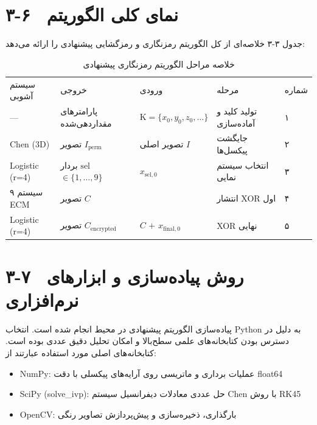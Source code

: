 \section{۳-۶  نمای کلی الگوریتم}

جدول ۳-۳ خلاصه‌ای از کل الگوریتم رمزنگاری و رمزگشایی پیشنهادی را ارائه می‌دهد:

\begin{table}[h]
\centering
\small
\begin{tabular}{lllll}
\hline
سیستم آشوبی & خروجی & ورودی & مرحله & شماره \\
‎---‎ & پارامترهای مقداردهی‌شده & $\mathrm{K} = \{x_0, y_0, z_0, \ldots\}$ & تولید کلید و آماده‌سازی & ۱ \\
‎Chen‎ (3‎D‎) & تصویر $I_{\mathrm{perm}}$ & تصویر اصلی $I$ & جایگشت پیکسل‌ها & ۲ \\
‎Logistic‎ (‎r=4‎) & بردار $\mathrm{sel}$\cite{ref1} $\in \{1,\ldots,9\}$ & $x_{\mathrm{sel},0}$ & انتخاب سیستم نمایی & ۳ \\
۹ سیستم  ‎ECM‎ & تصویر $C$ &  & انتشار ‎XOR‎ اول & ۴ \\
‎Logistic‎ (‎r=4‎) & تصویر $C_{\mathrm{encrypted}}$ & $C$ + $x_{\mathrm{final},0}$ & ‎XOR‎ نهایی & ۵ \\
\hline
\end{tabular}
\caption{خلاصه مراحل الگوریتم رمزنگاری پیشنهادی}
\end{table}

\section{۳-۷  روش پیاده‌سازی و ابزارهای نرم‌افزاری}

پیاده‌سازی الگوریتم پیشنهادی در محیط \pyver{} انجام شده است. انتخاب ‎Python‎ به دلیل در دسترس بودن کتابخانه‌های علمی سطح‌بالا و امکان تحلیل دقیق عددی بوده است. کتابخانه‌های اصلی مورد استفاده عبارتند از:

\begin{itemize}
    \item ‎NumPy‎:  عملیات برداری و ماتریسی روی آرایه‌های پیکسلی با دقت  ‎float64‎
\end{itemize}

\begin{itemize}
    \item ‎SciPy‎ (‎solve\_ivp‎):  حل عددی معادلات دیفرانسیل سیستم ‎Chen‎ با روش ‎RK45‎
\end{itemize}

\begin{itemize}
    \item ‎OpenCV‎:  بارگذاری، ذخیره‌سازی و پیش‌پردازش تصاویر رنگی
\end{itemize}

